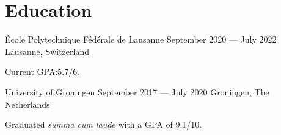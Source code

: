 \section*{Education}

\begin{cventries}
{École Polytechnique Fédérale de Lausanne} %
{September 2020 --- July 2022} %
{Lausanne, Switzerland} %
{%
  \begin{cvitems}
    \item Current GPA:\@ 5.7/6.
  \end{cvitems}
}
{University of Groningen}  %
{September 2017 --- July 2020} %
{Groningen, The Netherlands} %
{%
  \begin{cvitems}
    \item Graduated \textit{summa cum laude} with a GPA of 9.1/10.
  \end{cvitems}
}
\end{cventries}
